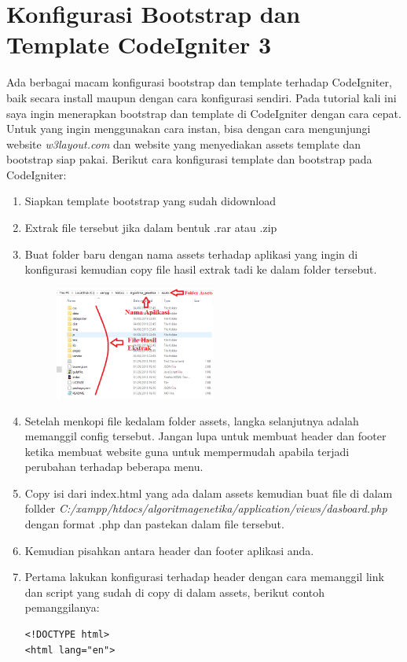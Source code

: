 \section{Konfigurasi Bootstrap dan Template CodeIgniter 3}
Ada berbagai macam konfigurasi bootstrap dan template terhadap CodeIgniter, baik secara install maupun dengan cara konfigurasi sendiri. Pada tutorial kali ini saya ingin menerapkan bootstrap dan template di CodeIgniter dengan cara cepat. Untuk yang ingin menggunakan cara instan, bisa dengan cara mengunjungi website \textit{w3layout.com} dan website yang menyediakan assets template dan bootstrap siap pakai. Berikut cara konfigurasi template dan bootstrap pada CodeIgniter:
\begin{enumerate}
    \item Siapkan template bootstrap yang sudah didownload
    \item Extrak file tersebut jika dalam bentuk .rar atau .zip
    \item Buat folder baru dengan nama assets terhadap aplikasi yang ingin di konfigurasi kemudian copy file hasil extrak tadi ke dalam folder tersebut.
		\begin{figure}[!htbp]
    		\centering
    		\includegraphics[width=0.5\textwidth]{figures/TBCI1.png}
    		\label{TBCI1}
		\end{figure}
		
	\item Setelah menkopi file kedalam folder assets, langka selanjutnya adalah memanggil config tersebut. Jangan lupa untuk membuat header dan footer ketika membuat website guna untuk mempermudah apabila terjadi perubahan terhadap beberapa menu.
	\item Copy isi dari index.html yang ada dalam assets kemudian buat file di dalam follder \textit{C:/xampp/htdocs/algoritmagenetika/application/views/dasboard.php} dengan format .php dan pastekan dalam file tersebut.
	\item Kemudian pisahkan antara header dan footer aplikasi anda.
	\item Pertama lakukan konfigurasi terhadap header dengan cara memanggil link dan script yang sudah di copy di dalam assets, berikut contoh pemanggilanya:
\begin{lstlisting}
<!DOCTYPE html>
<html lang="en">


\end{lstlisting}
\end{enumerate}
